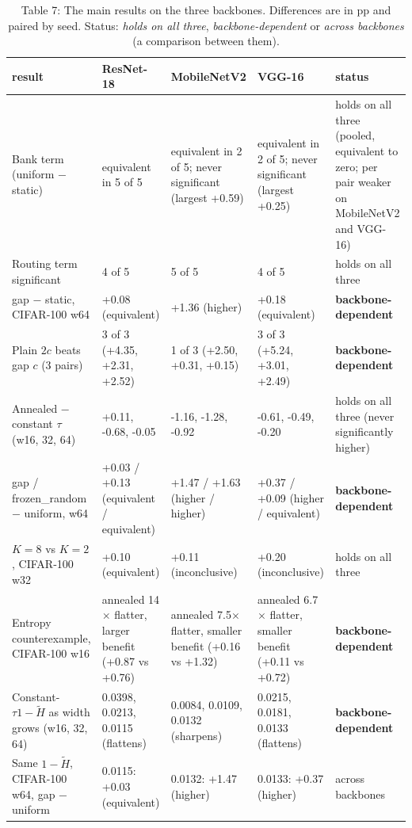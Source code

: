 \documentclass{article}
\begin{document}
\begin{table}
\caption{Table 7: The main results on the three backbones. Differences are in pp
and paired by seed. Status: \emph{holds on all three},
\emph{backbone-dependent} or \emph{across backbones} (a comparison
between them).}

\begin{tabular}{l l l l l}
\toprule
result & ResNet-18 & MobileNetV2 & VGG-16 & status \\
\midrule
Bank term (uniform − static) & equivalent in 5 of 5 & equivalent in 2 of 5; never significant (largest +0.59) & equivalent in 2 of 5; never significant (largest +0.25) & holds on all three (pooled, equivalent to zero; per pair weaker on MobileNetV2 and VGG-16) \\
Routing term significant & 4 of 5 & 5 of 5 & 4 of 5 & holds on all three \\
gap − static, CIFAR‑100 w64 & +0.08 (equivalent) & +1.36 (higher) & +0.18 (equivalent) & \textbf{backbone-dependent} \\
Plain $2c$ beats gap $c$ (3 pairs) & 3 of 3 (+4.35, +2.31, +2.52) & 1 of 3 (+2.50, +0.31, +0.15) & 3 of 3 (+5.24, +3.01, +2.49) & \textbf{backbone-dependent} \\
Annealed  −  constant $\tau$ (w16, 32, 64) & +0.11, -0.68, -0.05 & -1.16, -1.28, -0.92 & -0.61, -0.49, -0.20 & holds on all three (never significantly higher) \\
gap / frozen\_random  −  uniform, w64 & +0.03 / +0.13 (equivalent / equivalent) & +1.47 / +1.63 (higher / higher) & +0.37 / +0.09 (higher / equivalent) & \textbf{backbone-dependent} \\
$K=8$ vs $K=2$, CIFAR‑100 w32 & +0.10 (equivalent) & +0.11 (inconclusive) & +0.20 (inconclusive) & holds on all three \\
Entropy counterexample, CIFAR‑100 w16 & annealed 14$\times$ flatter, larger benefit (+0.87 vs +0.76) & annealed 7.5$\times$ flatter, smaller benefit (+0.16 vs +1.32) & annealed 6.7$\times$ flatter, smaller benefit (+0.11 vs +0.72) & \textbf{backbone-dependent} \\
Constant-$\tau 1-\tilde H$ as width grows (w16, 32, 64) & 0.0398, 0.0213, 0.0115 (flattens) & 0.0084, 0.0109, 0.0132 (sharpens) & 0.0215, 0.0181, 0.0133 (flattens) & \textbf{backbone-dependent} \\
Same $1-\tilde H$, CIFAR‑100 w64, gap − uniform & 0.0115: +0.03 (equivalent) & 0.0132: +1.47 (higher) & 0.0133: +0.37 (higher) & across backbones \\
\bottomrule
\end{tabular}
\end{table}
\end{document}
